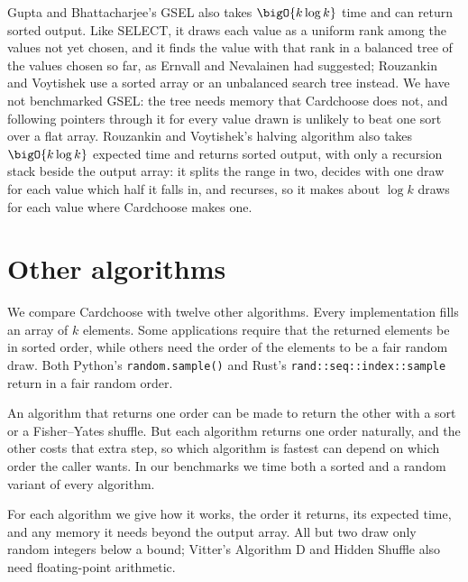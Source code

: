 \documentclass[letterpaper,11pt]{article}
\begin{document}
Gupta and Bhattacharjee's GSEL \cite{gupta} also takes
\(\bigO{k \log k}\) time and can return sorted output. Like SELECT, it
draws each value as a uniform rank among the values not yet chosen,
and it finds the value with that rank in a balanced tree of the values
chosen so far, as Ernvall and Nevalainen \cite{hsel} had suggested;
Rouzankin and Voytishek \cite{RouzankinVoytishek} use a sorted array
or an unbalanced search tree instead. We have not benchmarked GSEL:
the tree needs memory that Cardchoose does not, and following pointers
through it for every value drawn is unlikely to beat one sort over a
flat array. Rouzankin and Voytishek's halving algorithm also takes
\(\bigO{k \log k}\) expected time and returns sorted output, with only
a recursion stack beside the output array: it splits the range in two,
decides with one draw for each value which half it falls in, and
recurses, so it makes about \(\log k\) draws for each value where
Cardchoose makes one.

\section{Other algorithms}\label{otheralgs}
We compare Cardchoose with twelve other algorithms. Every
implementation fills an array of \(k\)
elements. Some applications require that the returned elements be in
sorted order, while others need the order of the elements to be a fair
random draw. Both Python's \texttt{random.sample()} and
Rust's \texttt{rand::seq::index::sample} return in a fair
random order.

An algorithm that returns one order can be made to return the other
with a sort or a Fisher--Yates shuffle. But each algorithm returns one
order naturally, and the other costs that extra step, so which
algorithm is fastest can depend on which order the caller wants. In
our benchmarks we time both a sorted and a random variant of every
algorithm.

For each algorithm we give how it works, the order it returns, its
expected time, and any memory it needs beyond the output array.
All but two draw only random integers below a bound;
Vitter's Algorithm D and Hidden Shuffle also need floating-point
arithmetic.
\end{document}
